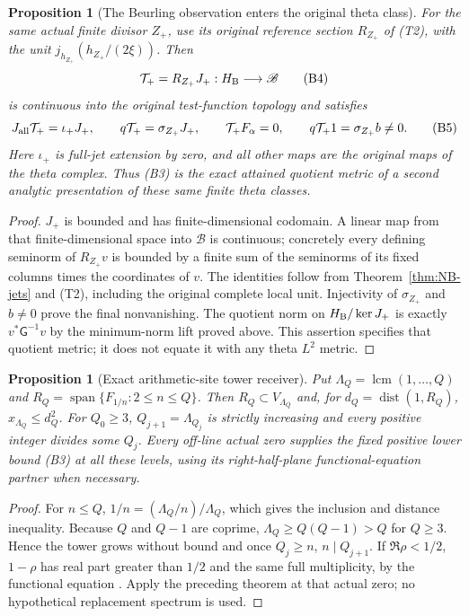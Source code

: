 \documentclass[11pt]{article}
\newtheorem{proposition}[theorem]{Proposition}
\newcommand{\B}{\mathscr B}\newcommand{\M}{\mathcal M}
\begin{document}
\begin{proposition}[The Beurling observation enters the original theta class]
For the same actual finite divisor $Z_+$, use its original reference
section $R_{Z_+}$ of (T2), with the unit $j_{h_{Z_+}}(h_{Z_+}/(2\xi))$.
Then
\[
 \mathcal T_+=R_{Z_+}J_+:H_{\rm B}\longrightarrow\B
 \tag{B4}
\]
is continuous into the original test-function topology and satisfies
\[
 J_{\rm all}\mathcal T_+=\iota_+J_+,\qquad
 q\mathcal T_+=\sigma_{Z_+}J_+,\qquad
 \mathcal T_+F_\alpha=0,\qquad
 q\mathcal T_+1=\sigma_{Z_+}b\ne0.
 \tag{B5}
\]
Here $\iota_+$ is full-jet extension by zero, and all other maps are
the original maps of the theta complex. Thus (B3) is the exact attained
quotient metric of a second analytic presentation of these same finite
theta classes.
\end{proposition}
\begin{proof}
$J_+$ is bounded and has finite-dimensional codomain. A linear map
from that finite-dimensional space into $\B$ is continuous; concretely
every defining seminorm of $R_{Z_+}v$ is bounded by a finite sum of the
seminorms of its fixed columns times the coordinates of $v$.
The identities follow from Theorem~\ref{thm:NB-jets} and (T2), including
the original complete local unit. Injectivity of $\sigma_{Z_+}$ and
$b\ne0$ prove the final nonvanishing. The quotient norm on
$H_{\rm B}/\ker J_+$ is exactly $v^*\mathsf G^{-1}v$ by the
minimum-norm lift proved above. This assertion specifies that quotient
metric; it does not equate it with any theta $L^2$ metric.
\end{proof}

\begin{proposition}[Exact arithmetic-site tower receiver]\label{prop:tower}
Put $\Lambda_Q=\operatorname{lcm}(1,\ldots,Q)$ and
$R_Q=\operatorname{span}\{F_{1/n}:2\leq n\leq Q\}$.
Then $R_Q\subset V_{\Lambda_Q}$ and, for
$d_Q=\operatorname{dist}(1,R_Q)$, $x_{\Lambda_Q}\leq d_Q^2$.
For $Q_0\geq3$, $Q_{j+1}=\Lambda_{Q_j}$ is strictly increasing and
every positive integer divides some $Q_j$.
Every off-line actual zero supplies the fixed positive lower bound (B3)
at all these levels, using its right-half-plane functional-equation partner
when necessary.
\end{proposition}
\begin{proof}
For $n\leq Q$, $1/n=(\Lambda_Q/n)/\Lambda_Q$, which gives the
inclusion and distance inequality. Because $Q$ and $Q-1$ are coprime,
$\Lambda_Q\geq Q(Q-1)>Q$ for $Q\geq3$. Hence the tower grows without
bound and once $Q_j\geq n$, $n\mid Q_{j+1}$. If $\Re\rho<1/2$,
$1-\rho$ has real part greater than $1/2$ and the same full
multiplicity, by the functional equation \cite{DLMF25}. Apply the preceding
theorem at that actual zero; no hypothetical replacement spectrum is used.
\end{proof}
\end{document}
